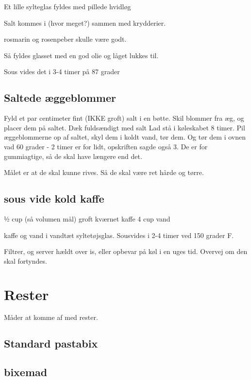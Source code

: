 \documentclass[
]{book}
\begin{document}
Et lille sylteglas fyldes med pillede hvidløg

Salt kommes i (hvor meget?) sammen med krydderier.

rosmarin og rosenpeber skulle være godt.

Så fyldes glasset med en god olie og låget lukkes til.

Sous vides det i 3-4 timer på 87 grader

\section{Saltede æggeblommer}\label{saltede-uxe6ggeblommer}

Fyld et par centimeter fint (IKKE groft) salt i en bøtte.
Skil blommer fra æg, og placer dem på saltet. Dæk fuldsændigt med salt
Lad stå i køleskabet 8 timer.
Pil æggeblommerne op af saltet, skyl dem i koldt vand, tør dem. Og
tør dem i ovnen vad 60 grader - 2 timer er for lidt, opskriften sagde også 3.
De er for gummiagtige, så de skal have længere end det.

Målet er at de skal kunne rives. Så de skal være ret hårde og tørre.

\section{sous vide kold kaffe}\label{sous-vide-kold-kaffe}

½ cup (så volumen mål) groft kværnet kaffe
4 cup vand

kaffe og vand i vandtæt syltetøjsglas. Sousvides i 2-4 timer ved 150 grader F.

Filtrer, og server hældt over is, eller opbevar på køl i en uges tid.
Overvej om den skal fortyndes.

\chapter{Rester}\label{rester}

Måder at komme af med rester.

\section{Standard pastabix}\label{standard-pastabix-1}

\section{bixemad}\label{bixemad}
\end{document}
